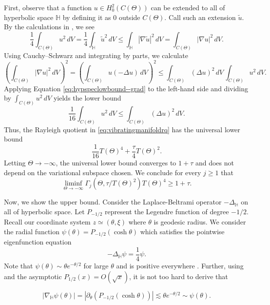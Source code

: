 \documentclass[11pt]{amsart}
\theoremstyle{definition}
\numberwithin{equation}{section}
\newcommand{\lapl}{\Delta}
\newcommand{\grad}{\nabla}
\renewcommand{\H}{\mathbb{H}}
\begin{document}
First, observe that a function $u \in H_0^2(C(\Theta))$ can be extended to all of hyperbolic space $\H$ by defining it as $0$ outside $C(\Theta)$. Call such an extension $\tilde{u}$. By the calculations in \cite[p.\,1]{M70}, we see
\begin{equation}\label{eq:hypspeclowbound--grad}
\frac{1}{4}\int_{C(\Theta)} u^2 \, dV=\frac{1}{4}\int_\H \tilde{u}^2 \, dV \leq \int_\H |\grad \tilde{u}|^2 \, dV = \int_{C(\Theta)} |\grad u|^2 \, dV.
\end{equation}
Using Cauchy--Schwarz and integrating by parts, we calculate
\[
\left(\int_{C(\Theta)} |\grad u|^2 \, dV\right)^2= \left( \int_{C(\Theta)} u(-\lapl u) \,dV \right)^2 \leq \int_{C(\Theta)} (\lapl u)^2 \,dV \, \int_{C(\Theta)}u^2 \,dV.
\]
Applying Equation \eqref{eq:hypspeclowbound--grad} to the left-hand side and dividing by $\int_{C(\Theta)}u^2 \,dV$ yields the lower bound
\begin{equation}\label{eq:hypspeclowbound--lapl}
\frac{1}{16}\int_{C(\Theta)} u^2 \, dV\leq \int_{C(\Theta)} (\lapl u)^2 \, dV.
\end{equation}
Thus, the Rayleigh quotient in \eqref{eq:vibratingmanifoldrq} has the universal lower bound
\[
\frac{1}{16}T(\Theta)^4 + \frac{\tau}{4}T(\Theta)^2.
\]
Letting $\Theta \to -\infty$, the universal lower bound converges to $1+ \tau$ and does not depend on the variational subspace chosen. We conclude for every $j \geq 1$ that
\[
\liminf_{\Theta \to -\infty} \Gamma_j(\Theta, \tau/T(\Theta)^2)T(\Theta)^4 \geq 1+ \tau.
\]

Now, we show the upper bound. Consider the Laplace-Beltrami operator $-\lapl_\H$ on all of hyperbolic space. Let $P_{-1/2}$ represent the Legendre function of degree $-1/2$. Recall our coordinate system $z \simeq (\theta,\xi)$ where $\theta$ is geodesic radius. We consider the radial function $\psi(\theta) = P_{-1/2}(\cosh \theta)$ which satisfies the pointwise eigenfunction equation
\[
-\lapl_\H \psi = \frac{1}{4}\psi.
\]
Note that $\psi(\theta) \sim \theta e^{-\theta/2}$ for large $\theta$ and is positive everywhere \cite[Section 14.8, Eq 14.8.14]{DLMF}. Further, using \cite[Section 14.10]{DLMF} and the asymptotic $P_{1/2}(x) = O(\sqrt x)$, it is not too hard to derive that 

\begin{equation}\label{eq:legendredevbound}
|\grad_\H \psi(\theta)| = |\partial_\theta (P_{-1/2}(\cosh \theta))| \lesssim \theta e^{-\theta/2} \sim \psi(\theta). 
\end{equation}
\end{document}
